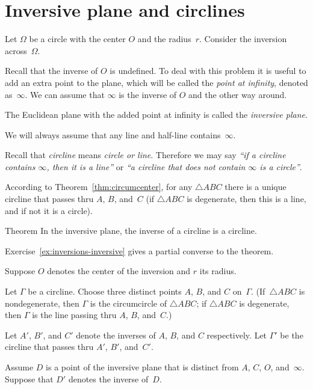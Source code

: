 \section{Inversive plane and circlines}

Let $\Omega$ be a circle with the center $O$ and the radius~$r$.
Consider the inversion across~$\Omega$.

Recall that the inverse of $O$ is undefined.
To deal with this problem it is useful to add an extra point to the plane, which will be called the \emph{point at infinity}, denoted as~$\infty$.
We can assume that $\infty$ is the inverse of $O$ and the other way around.

The Euclidean plane with the added point at infinity is called the \emph{inversive plane}.

We will always assume that any line and half-line contains~$\infty$. 

Recall that
\emph{circline}
means \textit{circle or line}.
Therefore we may say 
\textit{``if a circline contains $\infty$, then it is a line''} or \textit{``a circline that does not contain $\infty$  is a circle''}.

According to Theorem~\ref{thm:circumcenter}, 
for any $\triangle ABC$ there is a unique circline that passes thru $A$, $B$, and~$C$
(if $\triangle ABC$ is degenerate, then this is a line, and if not it is a circle).

\begin{thm}{Theorem}\label{thm:inverse-cline}
In the inversive plane, the inverse of a circline is a circline.
\end{thm}

Exercise~\ref{ex:inversions-inversive} gives a partial converse to the theorem.

Suppose $O$ denotes the center of the inversion and $r$ its radius.

Let $\Gamma$ be a circline.
Choose three distinct points $A$, $B$, and $C$ on~$\Gamma$.
(If~$\triangle ABC$ is nondegenerate, 
then $\Gamma$ is the circumcircle of $\triangle ABC$;
if $\triangle ABC$ is degenerate, 
then $\Gamma$ is the line passing thru $A$, $B$, and~$C$.)

Let $A'$, $B'$, and $C'$ denote the inverses of $A$, $B$, and $C$ respectively.
Let $\Gamma'$ be the circline that passes thru $A'$, $B'$, and~$C'$.

Assume $D$ is a point of the inversive plane that is distinct from $A$, $C$, $O$, and~$\infty$.
Suppose that $D'$ denotes the inverse of~$D$.

